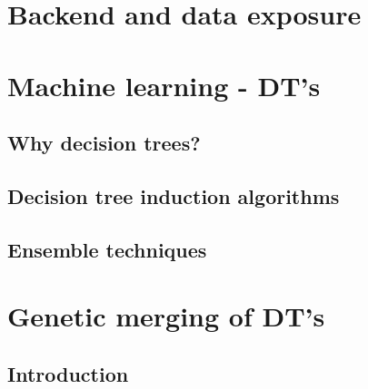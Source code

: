 \documentclass[english]{beamer}
\begin{document}
\section{Backend and data exposure}
\section{Machine learning - DT's}

\subsection*{Why decision trees?}

\subsection*{Decision tree induction algorithms}

\subsection*{Ensemble techniques}

\section{Genetic merging of DT's}
\subsection*{Introduction}
\end{document}
